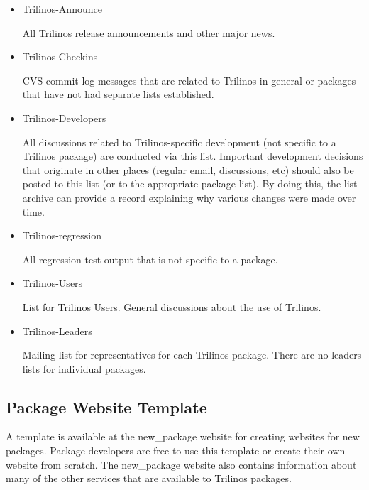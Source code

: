 \documentclass[12pt,relax]{TrilinosDevGuide}
\begin{document}
\begin{itemize}
\item Trilinos-Announce 

All Trilinos release announcements and other major news.

\item Trilinos-Checkins 

CVS commit log messages that are related to Trilinos in general or packages 
that have not had separate lists established.

\item Trilinos-Developers 

All discussions related to Trilinos-specific development (not specific to a 
Trilinos package) are conducted via this list.  Important development 
decisions that originate in other places (regular email, discussions, etc) 
should also be posted to this list (or to the appropriate package list).  
By doing this, the list archive can provide a record explaining why various 
changes were made over time.

\item Trilinos-regression 

All regression test output that is not specific to a package. 

\item Trilinos-Users 

List for Trilinos Users.  General discussions about the use of Trilinos.

\item Trilinos-Leaders

Mailing list for representatives for each Trilinos package.  There are no 
leaders lists for individual packages.
\end{itemize}

\subsection{Package Website Template}
\label{subsect:Website}

A template is available at the new\_package website \newline
{}
for creating websites for new packages.  Package developers are free to 
use this template or create their own website from scratch.  The 
new\_package website also contains information about many of the other 
services that are available to Trilinos packages.
\end{document}
